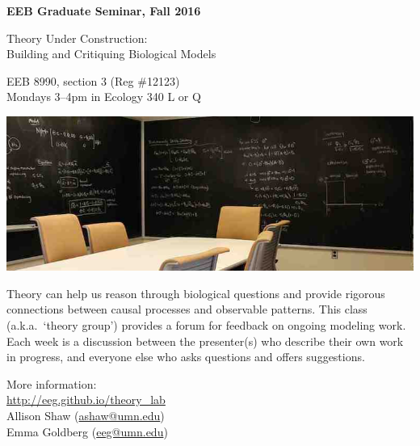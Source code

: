 \documentclass[17pt]{extarticle}
\begin{document}
\begin{center}
{\large {\bf
    EEB Graduate Seminar, Fall 2016

    Theory Under Construction: \\ Building and Critiquing Biological Models
}}
\end{center}

EEB 8990, section 3 (Reg \#12123) \\
Mondays 3--4pm in Ecology 340 L or Q

\vfill

\includegraphics[width=\textwidth]{../images/chalkboards.jpg}

\vfill

Theory can help us reason through biological questions and provide rigorous connections between causal processes and observable patterns.
This class (a.k.a.\ `theory group') provides a forum for feedback on ongoing modeling work.
Each week is a discussion between the presenter(s) who describe their own work in progress, and everyone else who asks questions and offers suggestions.

\vfill

More information: \\
\hspace{24pt} \url{http://eeg.github.io/theory_lab} \\
\hspace{24pt} Allison Shaw (\url{ashaw@umn.edu}) \\
\hspace{24pt} Emma Goldberg (\url{eeg@umn.edu})
\end{document}
